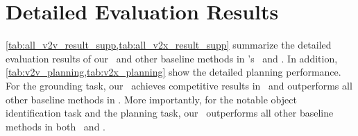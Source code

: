 

\clearpage
\setcounter{page}{1}
\maketitlesupplementary

\section{Detailed Evaluation Results}
\cref{tab:all_v2v_result_supp,tab:all_v2x_result_supp} summarize the detailed evaluation results of our \namemethod~and other baseline methods in \namedataset's \namevsplit~and \namexsplit. In addition, \cref{tab:v2v_planning,tab:v2x_planning} show the detailed planning performance. 
For the grounding task, our \namemethod~achieves competitive results in \namevsplit~and outperforms all other baseline methods in \namexsplit. More importantly, for the notable object identification task and the planning task, our \namemethod~outperforms all other baseline methods in both \namevsplit~and \namexsplit.


